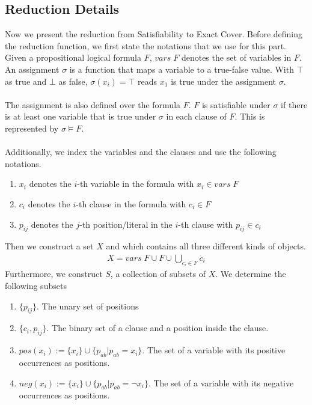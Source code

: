 \subsection{Reduction Details}
Now we present the reduction from Satisfiability to Exact Cover. 
Before defining the reduction function, we first state the notations that we use for this part. 
Given a propositional logical formula $F$, $vars\; F$ denotes the set of variables in $F$. 
An assignment $\sigma$ is a function that maps a variable to a true-false value. 
With $\top$ as true and $\bot$ as false, $\sigma(x_i) = \top$ reads $x_1$ is true under the assignment $\sigma$. \\\\
The assignment is also defined over the formula $F$. 
$F$ is satisfiable under $\sigma$ if there is at least one variable that is true under $\sigma$ in each clause of $F$. 
This is represented by $\sigma \models F$. \\\\
Additionally, we index the variables and the clauses and use the following notations.
\begin{enumerate}
    \item $x_i$ denotes the $i$-th variable in the formula with $x_i \in vars\; F$
    \item $c_i$ denotes the $i$-th clause in the formula with $c_i \in F$
    \item $p_{ij}$ denotes the $j$-th position/literal in the $i$-th clause with $p_{ij} \in c_i$
\end{enumerate} 
Then we construct a set $X$ and which contains all three different kinds of objects. 
\begin{align*}
    X = vars\; F \cup F \cup \bigcup_{c_i \in F} c_i
\end{align*}
Furthermore, we construct $S$, a collection of subsets of $X$. We determine the following subsets
\begin{enumerate}
    \item $\{p_{ij}\}$. The unary set of positions
    \item $\{c_i, p_{ij}\}$. The binary set of a clause and a position inside the clause.
    \item $pos(x_i) := \{x_i\} \cup \{p_{ab} | p_{ab} = x_i\}$. The set of a variable with its positive occurrences as positions.
    \item $neg(x_i):= \{x_i\} \cup \{p_{ab} | p_{ab} = \neg x_i\}$. The set of a variable with  its negative occurrences as positions.
\end{enumerate}
